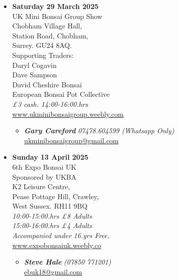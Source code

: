 \begin{itemize}
    \item \textbf{Saturday 29 March 2025}
    \\
    UK Mini Bonsai Group Show \\
    Chobham Village Hall, \\
    Station Road, Chobham, \\
    Surrey. GU24 8AQ. \\
    Supporting Traders: \\
    Daryl Cogavin \\
    Dave Sampson \\
    David Cheshire Bonsai \\
    European Bonsai Pot Collective
    \\
    \emph{£3 cash. 14:00-16:00.hrs}
    \\
    \href{https://www.ukminibonsaigroup.weebly.com}{www.ukminibonsaigroup.weebly.com}
    \begin{itemize}
        \item \textbf{\emph{Gary Careford}} \emph{07478.604599 (Whatsapp Only)} \\
        \href{mailto:ukminibonsaigroup@gmail.com}{ukminibonsaigroup@gmail.com} 
    \end{itemize}

    \item \textbf{Sunday 13 April 2025}
    \\
    6th Expo Bonsai UK \\
    Sponsored by UKBA \\
    K2 Leisure Centre, \\
    Pease Pottage Hill, Crawley, \\
    West Sussex. RH11 9BQ
    \\
    \emph{10:00-15:00.hrs £8 Adults} \\
    \emph{15:00-16:00.hrs £4 Adults} \\
    \emph{Accompanied under 16.yrs Free.}
    \\
    \href{http://www.expobonsaiuk.weebly.co/}{www.expobonsaiuk.weebly.co}
    \begin{itemize}
        \item \textbf{\emph{Steve Hale}} \emph{(07850 771201)} \\
        \href{mailto:ebuk18@gmail.com}{ebuk18@gmail.com} 
    \end{itemize}


\end{itemize}
